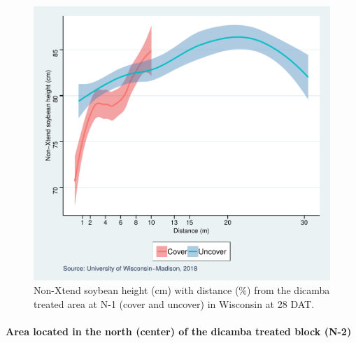 \documentclass[]{article}
\let\oldparagraph\paragraph
\renewcommand{\paragraph}[1]{\oldparagraph{#1}\mbox{}}
\begin{document}
\begin{figure}
\centering
\includegraphics{Report_Dicamba_study_files/figure-latex/unnamed-chunk-104-1.pdf}
\caption{Non-Xtend soybean height (cm) with distance (\%) from the
dicamba treated area at N-1 (cover and uncover) in Wisconsin at 28 DAT.}
\end{figure}

\pagebreak
\newpage

\paragraph{Area located in the north (center) of the dicamba treated
block
(N-2)}\label{area-located-in-the-north-center-of-the-dicamba-treated-block-n-2-1}
\end{document}
